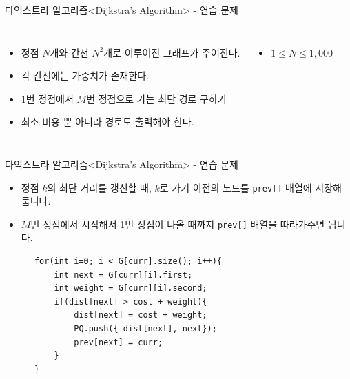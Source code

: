 \begin{frame}{다익스트라 알고리즘}{<Dijkstra's Algorithm> - 연습 문제}
  \begin{center}
  \end{center}
  \vspace{4mm}
  \begin{columns}[T]
      \begin{itemize}
        \item 정점 $N$개와 간선 $N^2$개로 이루어진 그래프가 주어진다.
        \item 각 간선에는 가중치가 존재한다.
        \item 1번 정점에서 $M$번 정점으로 가는 최단 경로 구하기
        \item 최소 비용 뿐 아니라 \alert{경로도 출력}해야 한다.
      \end{itemize}
      \begin{itemize}
        \item $1 \le N \le 1{,}000$
      \end{itemize}
  \end{columns}
\end{frame}

\begin{frame}[fragile]{다익스트라 알고리즘}{<Dijkstra's Algorithm> - 연습 문제}
  \begin{center}
  \end{center}
  \begin{itemize}
    \item 정점 $k$의 최단 거리를 갱신할 때, $k$로 가기 이전의 노드를 \texttt{prev[]}
      배열에 저장해 둡니다.
    \item $M$번 정점에서 시작해서 1번 정점이 나올 때까지 \texttt{prev[]} 배열을
      따라가주면 됩니다.
  \end{itemize}
  \vspace{2mm}
  \begin{center}
    \begin{verbatim}
      for(int i=0; i < G[curr].size(); i++){
          int next = G[curr][i].first;
          int weight = G[curr][i].second;
          if(dist[next] > cost + weight){
              dist[next] = cost + weight;
              PQ.push({-dist[next], next});
              prev[next] = curr;
          }
      }
    \end{verbatim}
  \end{center}
\end{frame}

